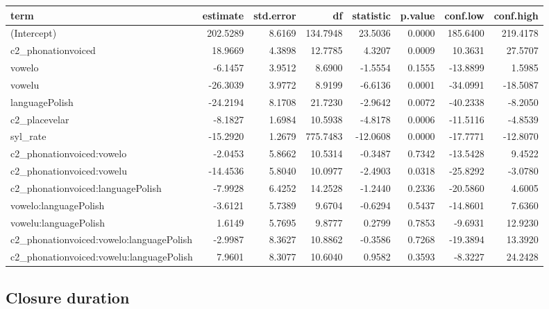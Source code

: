 \documentclass[preprint]{JASAnew}
\begin{document}
\scriptsize

\begin{tabular}{lrrrrrrr}
\toprule
term & estimate & std.error & df & statistic & p.value & conf.low & conf.high\\
\midrule
(Intercept) & 202.5289 & 8.6169 & 134.7948 & 23.5036 & 0.0000 & 185.6400 & 219.4178\\
c2\_phonationvoiced & 18.9669 & 4.3898 & 12.7785 & 4.3207 & 0.0009 & 10.3631 & 27.5707\\
vowelo & -6.1457 & 3.9512 & 8.6900 & -1.5554 & 0.1555 & -13.8899 & 1.5985\\
vowelu & -26.3039 & 3.9772 & 8.9199 & -6.6136 & 0.0001 & -34.0991 & -18.5087\\
languagePolish & -24.2194 & 8.1708 & 21.7230 & -2.9642 & 0.0072 & -40.2338 & -8.2050\\
\addlinespace
c2\_placevelar & -8.1827 & 1.6984 & 10.5938 & -4.8178 & 0.0006 & -11.5116 & -4.8539\\
syl\_rate & -15.2920 & 1.2679 & 775.7483 & -12.0608 & 0.0000 & -17.7771 & -12.8070\\
c2\_phonationvoiced:vowelo & -2.0453 & 5.8662 & 10.5314 & -0.3487 & 0.7342 & -13.5428 & 9.4522\\
c2\_phonationvoiced:vowelu & -14.4536 & 5.8040 & 10.0977 & -2.4903 & 0.0318 & -25.8292 & -3.0780\\
c2\_phonationvoiced:languagePolish & -7.9928 & 6.4252 & 14.2528 & -1.2440 & 0.2336 & -20.5860 & 4.6005\\
\addlinespace
vowelo:languagePolish & -3.6121 & 5.7389 & 9.6704 & -0.6294 & 0.5437 & -14.8601 & 7.6360\\
vowelu:languagePolish & 1.6149 & 5.7695 & 9.8777 & 0.2799 & 0.7853 & -9.6931 & 12.9230\\
c2\_phonationvoiced:vowelo:languagePolish & -2.9987 & 8.3627 & 10.8862 & -0.3586 & 0.7268 & -19.3894 & 13.3920\\
c2\_phonationvoiced:vowelu:languagePolish & 7.9601 & 8.3077 & 10.6040 & 0.9582 & 0.3593 & -8.3227 & 24.2428\\
\bottomrule
\end{tabular}
\normalsize

\hypertarget{closure-duration}{%
\subsection{Closure duration}\label{closure-duration}}

\scriptsize
\end{document}
